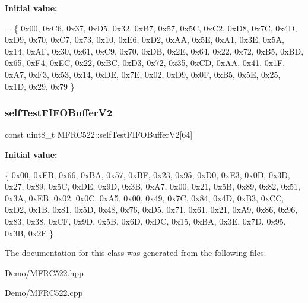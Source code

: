 {\bfseries Initial value\+:}
\begin{DoxyCode}
= \{
        0x00, 0xC6, 0x37, 0xD5, 0x32, 0xB7, 0x57, 0x5C,
        0xC2, 0xD8, 0x7C, 0x4D, 0xD9, 0x70, 0xC7, 0x73,
        0x10, 0xE6, 0xD2, 0xAA, 0x5E, 0xA1, 0x3E, 0x5A,
        0x14, 0xAF, 0x30, 0x61, 0xC9, 0x70, 0xDB, 0x2E,
        0x64, 0x22, 0x72, 0xB5, 0xBD, 0x65, 0xF4, 0xEC,
        0x22, 0xBC, 0xD3, 0x72, 0x35, 0xCD, 0xAA, 0x41,
        0x1F, 0xA7, 0xF3, 0x53, 0x14, 0xDE, 0x7E, 0x02,
        0xD9, 0x0F, 0xB5, 0x5E, 0x25, 0x1D, 0x29, 0x79
    \}
\end{DoxyCode}
\mbox{\label{class_m_f_r_c522_a6973b73a8a922ac09b9d89489bdbc333}} 
\subsubsection{\texorpdfstring{self\+Test\+F\+I\+F\+O\+Buffer\+V2}{selfTestFIFOBufferV2}}
{\footnotesize\ttfamily const uint8\+\_\+t M\+F\+R\+C522\+::self\+Test\+F\+I\+F\+O\+Buffer\+V2\mbox{[}64\mbox{]}}

{\bfseries Initial value\+:}
\begin{DoxyCode}
\{
        0x00, 0xEB, 0x66, 0xBA, 0x57, 0xBF, 0x23, 0x95,
        0xD0, 0xE3, 0x0D, 0x3D, 0x27, 0x89, 0x5C, 0xDE,
        0x9D, 0x3B, 0xA7, 0x00, 0x21, 0x5B, 0x89, 0x82,
        0x51, 0x3A, 0xEB, 0x02, 0x0C, 0xA5, 0x00, 0x49,
        0x7C, 0x84, 0x4D, 0xB3, 0xCC, 0xD2, 0x1B, 0x81,
        0x5D, 0x48, 0x76, 0xD5, 0x71, 0x61, 0x21, 0xA9,
        0x86, 0x96, 0x83, 0x38, 0xCF, 0x9D, 0x5B, 0x6D,
        0xDC, 0x15, 0xBA, 0x3E, 0x7D, 0x95, 0x3B, 0x2F
    \}
\end{DoxyCode}


The documentation for this class was generated from the following files\+:\begin{DoxyCompactItemize}
\item 
Demo/M\+F\+R\+C522.\+hpp\item 
Demo/M\+F\+R\+C522.\+cpp\end{DoxyCompactItemize}

